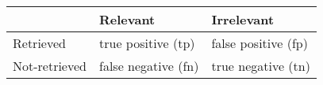 
{
\sffamily


\begin{tabular}{ | l | l | l | }
    \hline
     & Relevant & Irrelevant  \\ \hline
   Retrieved & true positive (tp) & false positive (fp) \\ \hline
    Not-retrieved & false negative (fn) & true negative (tn) \\ \hline
       
\end{tabular}
}
